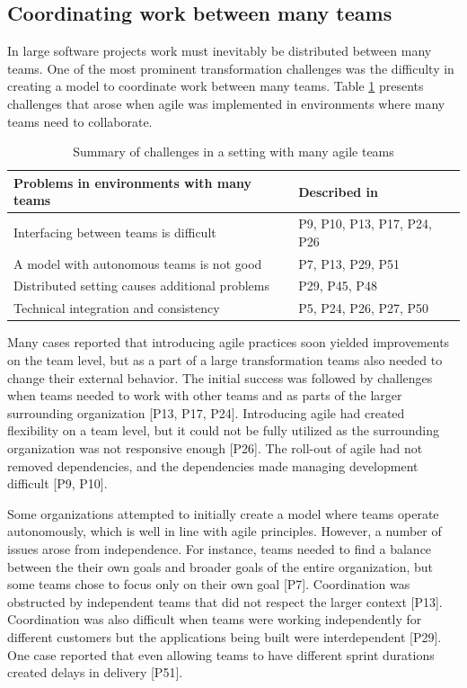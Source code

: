 \subsection{Coordinating work between many teams}

In large software projects work must inevitably be distributed between many
teams. One of the most prominent transformation challenges was the difficulty in
creating a model to coordinate work between many teams. Table
\ref{table:challenges_coordinatingteams} presents challenges that arose when
agile was implemented in environments where many teams need to collaborate.

\begin{table}[h]
    \centering
    \begin{tabular}{ >{\raggedright\arraybackslash}p{}
                     >{\raggedright\arraybackslash}p{} }
        \toprule
        Problems in environments with many teams  &  Described in \\
        \midrule
        Interfacing between teams is difficult     &  P9, P10, P13, P17, P24, P26 \\
        A model with autonomous teams is not good  &  P7, P13, P29, P51  \\
        Distributed setting causes additional problems  &  P29, P45, P48  \\
        Technical integration and consistency      &  P5, P24, P26, P27, P50  \\
        \bottomrule
    \end{tabular}
    \caption{Summary of challenges in a setting with many agile teams}
    \label{table:challenges_coordinatingteams}
\end{table}

Many cases reported that introducing agile practices soon yielded improvements
on the team level, but as a part of a large transformation teams also needed to
change their external behavior.
The initial success was followed by challenges when teams needed to work with
other teams and as parts of the larger surrounding organization [P13, P17, P24].
Introducing agile had created flexibility on a team level, but it could not be
fully utilized as the surrounding organization was not responsive enough [P26].
The roll-out of agile had not removed dependencies, and the dependencies
made managing development difficult [P9, P10].


Some organizations attempted to initially create a model where teams operate
autonomously, which is well in line with agile principles. However, a number of
issues arose from independence. For instance, teams needed to find a balance
between the their own goals and broader goals of the entire organization, but
some teams chose to focus only on their own goal [P7]. Coordination was
obstructed by independent teams that did not respect the larger context [P13].
Coordination was also difficult when teams were working independently for
different customers but the applications being built were interdependent [P29].
One case reported that even allowing teams to have different sprint durations
created delays in delivery [P51].

